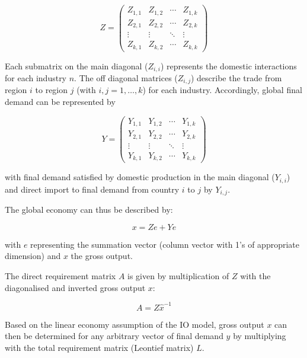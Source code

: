 \documentclass{jors}
\begin{document}
{\begin{equation}
    Z =
    \begin{pmatrix}
      Z_{1,1} & Z_{1,2} & \cdots & Z_{1,k} \\
      Z_{2,1} & Z_{2,2} & \cdots & Z_{2,k} \\
      \vdots  & \vdots  & \ddots & \vdots  \\
      Z_{k,1} & Z_{k,2} & \cdots & Z_{k,k}
    \end{pmatrix}
\end{equation}

Each submatrix on the main diagonal ($Z_{i,i}$) represents the domestic
interactions for each industry $n$. The off diagonal matrices ($Z_{i,j}$)
describe the trade from region $i$ to region $j$ (with $i, j = 1, \ldots, k$)
for each industry. Accordingly, global final demand can be represented by

\begin{equation}
    Y =
    \begin{pmatrix}
      Y_{1,1} & Y_{1,2} & \cdots & Y_{1,k} \\
      Y_{2,1} & Y_{2,2} & \cdots & Y_{2,k} \\
      \vdots  & \vdots  & \ddots & \vdots  \\
      Y_{k,1} & Y_{k,2} & \cdots & Y_{k,k}
    \end{pmatrix}
\end{equation}

with final demand satisfied by domestic production in the main diagonal
($Y_{i,i}$) and direct import to final demand from country $i$ to $j$ by
$Y_{i,j}$.

The global economy can thus be described by:

\begin{equation}
    x = Ze + Ye
\end{equation}

with $e$ representing the summation vector (column vector with 1's of
appropriate dimension) and $x$ the gross output.

The direct requirement matrix $A$ is given by multiplication of $Z$ with the
diagonalised and inverted gross output $x$:

\begin{equation}
    A = Z\hat{x}^{-1}
\end{equation}

Based on the linear economy assumption of the IO model, gross output $x$ can then be determined for any arbitrary vector of final demand $y$ by multiplying with the total requirement matrix (Leontief matrix) $L$.

}
\end{document}
